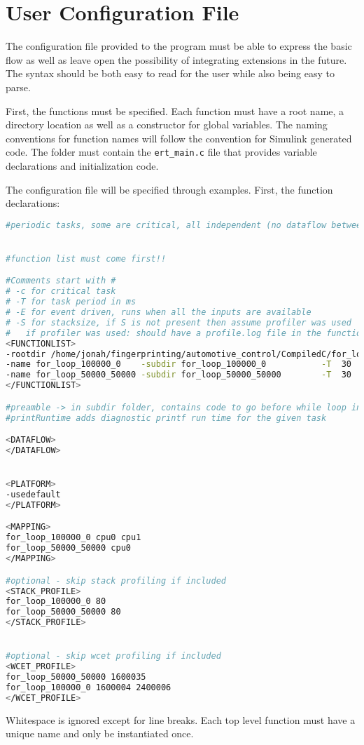 
\chapter{User Configuration File} %

\label{A:ConfigFile} %


The configuration file provided to the program must be able to express the basic flow as well as leave open the possibility of integrating extensions in the future. The syntax should be both easy to read for the user while also being easy to parse.

First, the functions must be specified. Each function must have a root name, a directory location as well as a constructor for global variables. The naming conventions for function names will follow the convention for Simulink generated code. The folder must contain the \texttt{ert\_main.c} file that provides variable declarations and initialization code.

The configuration file will be specified through examples. First, the function declarations:

\begin{lstlisting}[caption={Function configuration syntax},label=l:config-function,language=bash]
#periodic tasks, some are critical, all independent (no dataflow between tasks)


#function list must come first!!

#Comments start with #
# -c for critical task
# -T for task period in ms
# -E for event driven, runs when all the inputs are available
# -S for stacksize, if S is not present then assume profiler was used
# 	if profiler was used: should have a profile.log file in the function folders
<FUNCTIONLIST>
-rootdir /home/jonah/fingerprinting/automotive_control/CompiledC/for_loops
-name for_loop_100000_0    -subdir for_loop_100000_0           -T  30   -c  -Priority 2	
-name for_loop_50000_50000 -subdir for_loop_50000_50000		   -T  30       -Priority 1 -printRuntime -addPreamble preamble.txt
</FUNCTIONLIST>

#preamble -> in subdir folder, contains code to go before while loop in task, used for threadsafe newlib config, should not have extension .c or .h
#printRuntime adds diagnostic printf run time for the given task

<DATAFLOW>
</DATAFLOW>


<PLATFORM>
-usedefault
</PLATFORM>

<MAPPING>
for_loop_100000_0 cpu0 cpu1
for_loop_50000_50000 cpu0
</MAPPING>

#optional - skip stack profiling if included
<STACK_PROFILE>
for_loop_100000_0 80
for_loop_50000_50000 80
</STACK_PROFILE>


#optional - skip wcet profiling if included
<WCET_PROFILE>
for_loop_50000_50000 1600035
for_loop_100000_0 1600004 2400006
</WCET_PROFILE>
\end{lstlisting}


Whitespace is ignored except for line breaks. Each top level function must have a unique name and only be instantiated once.
